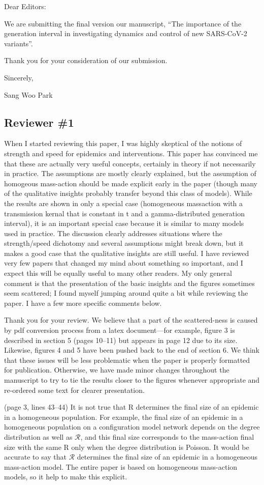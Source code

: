 \documentclass[12pt]{article}
\newcommand{\RR}{\ensuremath{{\mathcal R}}\xspace}
\newcommand{\rev}{\subsection*}
\newcommand{\revtext}{\textsf}
\begin{document}
\noindent Dear Editors:

We are submitting the final version our manuscript, “The importance of the generation interval in investigating dynamics and control of new SARS-CoV-2 variants”.

Thank you for your consideration of our submission.

Sincerely,

Sang Woo Park

\rev{Reviewer \#1}

\revtext{When I started reviewing this paper, I was highly skeptical of the notions of strength and speed for epidemics and interventions. This paper has convinced me that these are actually very useful concepts, certainly in theory if not necessarily in practice. The assumptions are mostly clearly explained, but the assumption of homogeous mass-action should be made explicit early in the paper (though many of the qualitative insights probably transfer beyond this class of models). While the results are shown in only a special case (homogeneous massaction with a transmission kernal that is constant in t and a gamma-distributed generation interval), it is an important special case because it is similar to many models used in practice. The discussion clearly addresses situations where the strength/speed dichotomy and several assumptions might break down, but it makes a good case that the qualitative insights are still useful. I have reviewed very few papers that changed my mind about something so important, and I expect this will be equally useful to many other readers. My only general comment is that the presentation of the basic insights and the figures sometimes seem scattered; I found myself jumping around quite a bit while reviewing the paper. I have a few more specific comments below.}

Thank you for your review. We believe that a part of the scattered-ness is caused by pdf conversion process from a latex document---for example, figure 3 is described in section 5 (pages 10--11) but appears in page 12 due to its size. Likewise, figures 4 and 5 have been pushed back to the end of section 6. We think that these issues will be less problematic when the paper is properly formatted for publication. Otherwise, we have made minor changes throughout the manuscript to try to tie the results closer to the figures whenever appropriate and re-ordered some text for clearer presentation. 

\revtext{(page 3, lines 43–44) It is not true that R determines the final size of an epidemic in a homogeneous population. For example, the final size of an epidemic in a homogeneous population on a configuration model network depends on the degree distribution as well as $\RR$, and this final size corresponds to the mass-action final size with the same R only when the degree distribution is Poisson. It would be accurate to say that $\RR$ determines the final size of an epidemic in a homogeneous mass-action model. The entire paper is based on homogeneous mass-action models, so it help to make this explicit.}
\end{document}
